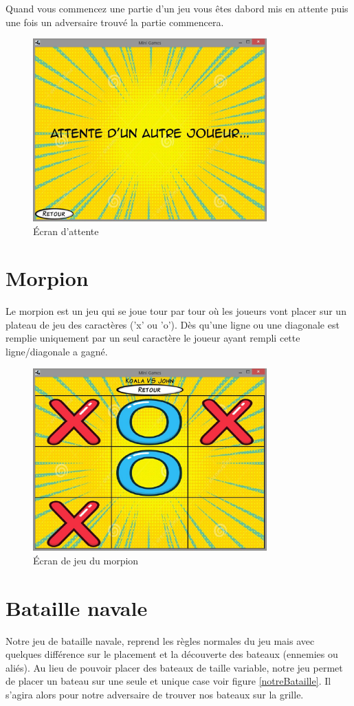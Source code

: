 \documentclass{report}
\begin{document}
Quand vous commencez une partie d'un jeu vous êtes dabord mis en attente puis
une fois un adversaire trouvé la partie commencera.

\begin{figure}[H]
	\centering\includegraphics[width=9cm]{morpionwaiting}
	\caption{Écran d'attente}
\end{figure}

\chapter{Morpion}
Le morpion est un jeu qui se joue tour par tour où les joueurs vont placer sur un
plateau de jeu des caractères ('x' ou 'o'). Dès qu'une ligne ou une diagonale est remplie uniquement par un seul caractère
le joueur ayant rempli cette ligne/diagonale a gagné.

\begin{figure}[H]
	\centering\includegraphics[width=9cm]{morpioningame}
	\caption{Écran de jeu du morpion}
\end{figure}


\chapter{Bataille navale}
Notre jeu de bataille navale, reprend les règles normales du jeu mais avec quelques différence sur le placement et la découverte des bateaux (ennemies ou aliés). Au lieu de pouvoir placer
des bateaux de taille variable, notre jeu permet de placer un bateau sur une seule et unique case
voir figure \ref{notreBataille}. Il s'agira alors pour notre adversaire de trouver nos bateaux sur la grille.
\end{document}
